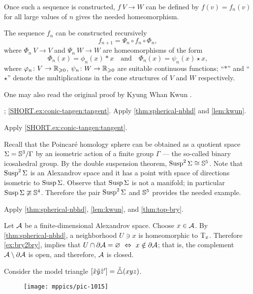 Once such a sequence is constructed, $f\:V\to W$ can be defined by $f(v)=f_n(v)$ for all large values of $n$ gives the needed homeomorphism.

The sequence $f_n$ can be constructed recursively
\[f_{n+1}=\Psi_n\circ f_n\circ \Phi_n,\]
where $\Phi_n\:V\to V$ 
and $\Psi_n\:W\to W$ 
are homeomorphisms
of the form 
\[\Phi_n(x)=\phi_n(x)\ast x\quad \text{and}\quad \Phi_n(x)=\psi_n(x)\star x,\]
where $\varphi_n\colon V\to \mathbb{R}_{\geqslant 0}$, $\psi_n\colon W\to \mathbb{R}_{\geqslant 0}$ are suitable continuous functions;
``$\ast$'' and ``$\star$'' denote the multiplications in the cone structures of $V$ and $W$ respectively.

 One may also read the original proof by Kyung Whan Kwun \cite{kwun1964}.

\parbf{\ref{ex:conic-tangent}}; \ref{SHORT.ex:conic-tangen:tangent}. Apply \ref{thm:spherical-nbhd} and \ref{lem:kwun}.

 Apply \ref{SHORT.ex:conic-tangen:tangent}.

 Recall that the Poincaré homology sphere can be obtained as a quotient space $\Sigma=\mathbb{S}^3/\Gamma$ by an isometric action of a finite group $\Gamma$  --- the so-called binary icosahedral group.
By the double suspension theorem,  $\mathop{\rm Susp}\nolimits^2\Sigma\cong\mathbb{S}^5$.
Note that $\mathop{\rm Susp}\nolimits^2\Sigma$ is an Alexandrov space and it has a point with space of directions isometric to $\mathop{\rm Susp}\nolimits\Sigma$.
Observe that $\mathop{\rm Susp}\nolimits\Sigma$ is not a manifold; in particular $\mathop{\rm Susp}\nolimits\Sigma\ncong\mathbb{S}^4$.
Therefore the pair $\mathop{\rm Susp}\nolimits^2\Sigma$ and $\mathbb{S}^5$ provides the needed example.

 Apply \ref{thm:spherical-nbhd}, \ref{lem:kwun}, and \ref{thm:top-bry}.

Let $\mathcal{A}$ be a finite-dimensional Alexandrov space.
Choose $x\in\mathcal{A}$.
By \ref{thm:spherical-nbhd}, a neighborhood $U\ni x$ is homeomorphic to $\mathrm{T}_x$.
Therefore \ref{ex:bry2bry}, implies that $U\cap\partial\spc{A}=\emptyset\  \Leftrightarrow\ x\notin \partial\spc{A}$;
that is, the complement $\mathcal{A}\setminus\partial\mathcal{A}$ is open, and therefore, $\mathcal{A}$ is closed.

Consider the model triangle $[\tilde x\tilde y\tilde z']=\tilde\triangle(xyz)$.
\begin{figure}[ht!]
\vskip-0mm
\centering
\texttt{[image: mppics/pic-1015]}
\end{figure}

